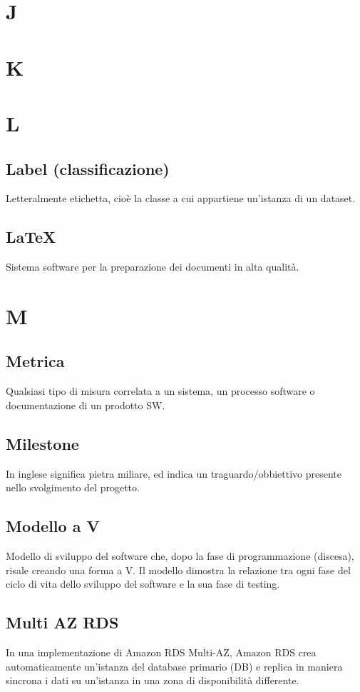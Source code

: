 \documentclass{classes/base}
\begin{document}
    \section{J}
    \newpage  
    \section{K}
    \newpage  
    \section{L}
        \subsection*{Label (classificazione)}
        Letteralmente etichetta, cioè la classe a cui appartiene un'istanza di un dataset.
        
        \subsection*{LaTeX}
        Sistema software per la preparazione dei documenti in alta qualità.

    \newpage  
    \section{M} 
        \subsection*{Metrica}
        Qualsiasi tipo di misura correlata a un sistema, un processo software  o  documentazione  di  un  prodotto  SW. 

        \subsection*{Milestone}
        In inglese significa pietra miliare, ed indica un traguardo/obbiettivo presente nello svolgimento del progetto.
        
        \subsection*{Modello a V}
        Modello di sviluppo del software che, dopo la fase di programmazione (discesa), risale creando una forma a V. Il modello dimostra la relazione tra ogni fase del ciclo di vita dello sviluppo del software e la sua fase di testing.

        \subsection*{Multi AZ RDS} 
        In una implementazione di Amazon RDS Multi-AZ, Amazon RDS crea automaticamente un’istanza del database primario (DB) e replica in maniera sincrona i dati su un’istanza in una zona di disponibilità differente.
\end{document}
